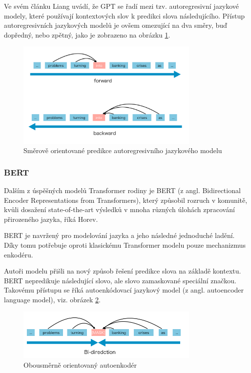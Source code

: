 \documentclass[thesis=M,czech]{FITthesis}[2019/12/23]
\begin{document}
Ve svém článku\cite{liang2019} Liang uvádí, že GPT se řadí mezi tzv. autoregresivní jazykové modely, které používají kontextových slov k predikci slova následujícího. Přístup autoregresivních jazykových modelů je ovšem omezující na dva směry, buď dopředný, nebo zpětný, jako je zobrazeno na obrázku \ref{fig:liang2019GPT}.
\begin{figure}\centering
	\includegraphics[width=0.8\textwidth]{images/liang2019/liang2019_GPT.png}
	\caption{Směrově orientované predikce autoregresivního jazykového modelu\cite{liang2019}}\label{fig:liang2019GPT}
\end{figure}

\subsubsection{BERT}
Dalším z úspěšných modelů Transformer rodiny je BERT (z angl. Bidirectional Encoder Representations from Transformers)\cite{devlin2018}, který způsobil rozruch v komunitě, kvůli dosažení state-of-the-art výsledků v mnoha různých úlohách zpracování přirozeného jazyka, říká Horev\cite{horev2018}.

BERT je navržený pro modelování jazyka a jeho následné jednoduché ladění. Díky tomu potřebuje oproti klasickému Transformer modelu pouze mechanizmus enkodéru.

Autoři modelu přišli na nový způsob řešení predikce slova na základě kontextu. BERT nepredikuje následující slovo, ale slovo zamaskované speciální značkou. Takovému přístupu se říká autoenkódovací jazykový model (z angl. autoencoder language model), viz. obrázek \ref{fig:liang2019BERT}.
\begin{figure}\centering
	\includegraphics[width=0.8\textwidth]{images/liang2019/liang2019_BERT.png}
	\caption{Obousměrně orientovaný autoenkodér\cite{liang2019}}\label{fig:liang2019BERT}
\end{figure}
\end{document}
